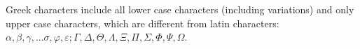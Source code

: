 Greek characters include all lower case characters (including variations) and only upper case characters, which are different from latin characters: $\alpha, \beta, \gamma, ... \sigma, \varphi, \varepsilon; \Gamma, \Delta, \Theta, \Lambda, \Xi, \Pi, \Sigma, \Phi, \Psi, \Omega$.



